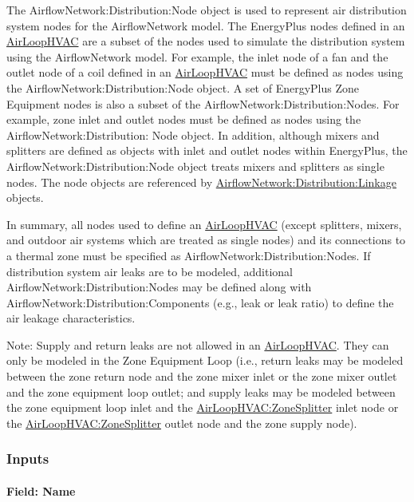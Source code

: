 The AirflowNetwork:Distribution:Node object is used to represent air distribution system nodes for the AirflowNetwork model. The EnergyPlus nodes defined in an \hyperref[airloophvac]{AirLoopHVAC} are a subset of the nodes used to simulate the distribution system using the AirflowNetwork model. For example, the inlet node of a fan and the outlet node of a coil defined in an \hyperref[airloophvac]{AirLoopHVAC} must be defined as nodes using the AirflowNetwork:Distribution:Node object. A set of EnergyPlus Zone Equipment nodes is also a subset of the AirflowNetwork:Distribution:Nodes. For example, zone inlet and outlet nodes must be defined as nodes using the AirflowNetwork:Distribution: Node object. In addition, although mixers and splitters are defined as objects with inlet and outlet nodes within EnergyPlus, the AirflowNetwork:Distribution:Node object treats mixers and splitters as single nodes. The node objects are referenced by \hyperref[airflownetworkdistributionlinkage]{AirflowNetwork:Distribution:Linkage} objects.

In summary, all nodes used to define an \hyperref[airloophvac]{AirLoopHVAC} (except splitters, mixers, and outdoor air systems which are treated as single nodes) and its connections to a thermal zone must be specified as AirflowNetwork:Distribution:Nodes. If distribution system air leaks are to be modeled, additional AirflowNetwork:Distribution:Nodes may be defined along with AirflowNetwork:Distribution:Components (e.g., leak or leak ratio) to define the air leakage characteristics.

Note: Supply and return leaks are not allowed in an \hyperref[airloophvac]{AirLoopHVAC}. They can only be modeled in the Zone Equipment Loop (i.e., return leaks may be modeled between the zone return node and the zone mixer inlet or the zone mixer outlet and the zone equipment loop outlet; and supply leaks may be modeled between the zone equipment loop inlet and the \hyperref[airloophvaczonesplitter]{AirLoopHVAC:ZoneSplitter} inlet node or the \hyperref[airloophvaczonesplitter]{AirLoopHVAC:ZoneSplitter} outlet node and the zone supply node).

\subsubsection{Inputs}\label{inputs-12-001}

\paragraph{Field: Name}\label{field-name-14-000}

